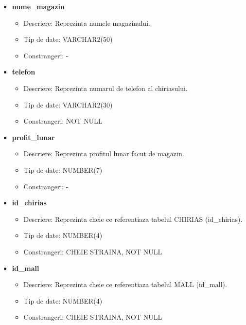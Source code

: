 \begin{enumerate}
\begin{itemize}
        \item \textbf{nume\_magazin}
                \begin{itemize}
                    \item Descriere: Reprezinta numele magazinului.
                    \item Tip de date: VARCHAR2(50)
                    \item Constrangeri: -
                \end{itemize}

        \item \textbf{telefon}
                \begin{itemize}
                    \item Descriere: Reprezinta numarul de telefon al chiriasului.
                    \item Tip de date: VARCHAR2(30)
                    \item Constrangeri: NOT NULL
                \end{itemize}

        \item \textbf{profit\_lunar}
                \begin{itemize}
                    \item Descriere: Reprezinta profitul lunar facut de magazin.
                    \item Tip de date: NUMBER(7)
                    \item Constrangeri: -
                \end{itemize}


        \item \textbf{id\_chirias}
                \begin{itemize}
                    \item Descriere: Reprezinta cheie ce referentiaza tabelul CHIRIAS (id\_chirias).
                    \item Tip de date: NUMBER(4)
                    \item Constrangeri: CHEIE STRAINA, NOT NULL
                \end{itemize}

        \item \textbf{id\_mall}
                \begin{itemize}
                    \item Descriere: Reprezinta cheie ce referentiaza tabelul MALL (id\_mall).
                    \item Tip de date: NUMBER(4)
                    \item Constrangeri: CHEIE STRAINA, NOT NULL
                \end{itemize}
    \end{itemize}


\end{enumerate}

